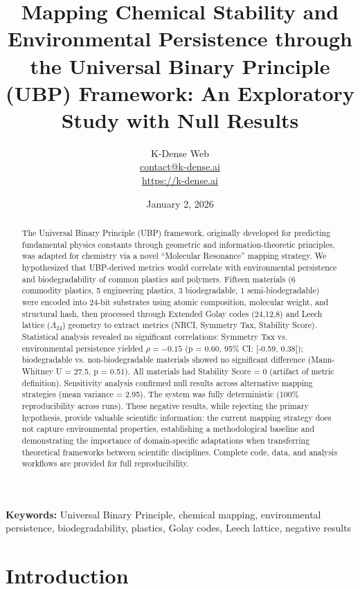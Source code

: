 \documentclass[11pt,letterpaper]{article}
\title{
    \textbf{Mapping Chemical Stability and Environmental Persistence through the Universal Binary Principle (UBP) Framework: An Exploratory Study with Null Results}
}
\author{
    K-Dense Web\\
    \small \href{mailto:contact@k-dense.ai}{contact@k-dense.ai}\\
    \small \url{https://k-dense.ai}
}
\date{January 2, 2026}
\begin{document}
\maketitle

\begin{abstract}
The Universal Binary Principle (UBP) framework, originally developed for predicting fundamental physics constants through geometric and information-theoretic principles, was adapted for chemistry via a novel ``Molecular Resonance'' mapping strategy. We hypothesized that UBP-derived metrics would correlate with environmental persistence and biodegradability of common plastics and polymers. Fifteen materials (6 commodity plastics, 5 engineering plastics, 3 biodegradable, 1 semi-biodegradable) were encoded into 24-bit substrates using atomic composition, molecular weight, and structural hash, then processed through Extended Golay codes (24,12,8) and Leech lattice ($\Lambda_{24}$) geometry to extract metrics (NRCI, Symmetry Tax, Stability Score). Statistical analysis revealed no significant correlations: Symmetry Tax vs. environmental persistence yielded $\rho = -0.15$ (p = 0.60, 95\% CI: [-0.59, 0.38]); biodegradable vs. non-biodegradable materials showed no significant difference (Mann-Whitney U = 27.5, p = 0.51). All materials had Stability Score = 0 (artifact of metric definition). Sensitivity analysis confirmed null results across alternative mapping strategies (mean variance = 2.95). The system was fully deterministic (100\% reproducibility across runs). These negative results, while rejecting the primary hypothesis, provide valuable scientific information: the current mapping strategy does not capture environmental properties, establishing a methodological baseline and demonstrating the importance of domain-specific adaptations when transferring theoretical frameworks between scientific disciplines. Complete code, data, and analysis workflows are provided for full reproducibility.
\end{abstract}

\textbf{Keywords:} Universal Binary Principle, chemical mapping, environmental persistence, biodegradability, plastics, Golay codes, Leech lattice, negative results

\clearpage

\section{Introduction}
\end{document}
